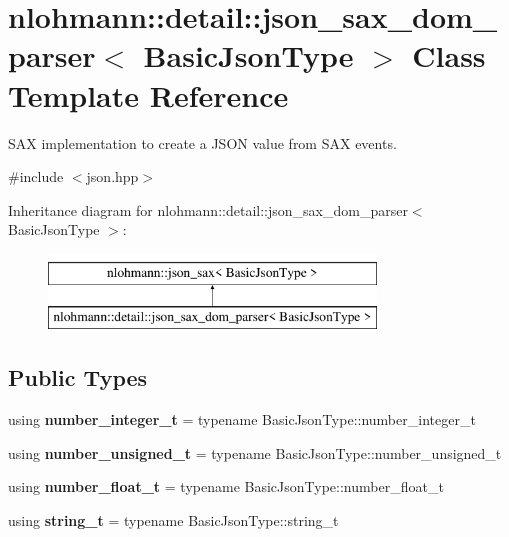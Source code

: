 \hypertarget{classnlohmann_1_1detail_1_1json__sax__dom__parser}{}\section{nlohmann\+:\+:detail\+:\+:json\+\_\+sax\+\_\+dom\+\_\+parser$<$ Basic\+Json\+Type $>$ Class Template Reference}
\label{classnlohmann_1_1detail_1_1json__sax__dom__parser}


S\+AX implementation to create a J\+S\+ON value from S\+AX events.  




{\ttfamily \#include $<$json.\+hpp$>$}

Inheritance diagram for nlohmann\+:\+:detail\+:\+:json\+\_\+sax\+\_\+dom\+\_\+parser$<$ Basic\+Json\+Type $>$\+:\begin{figure}[H]
\begin{center}
\leavevmode
\includegraphics[height=2.000000cm]{classnlohmann_1_1detail_1_1json__sax__dom__parser}
\end{center}
\end{figure}
\subsection*{Public Types}
\begin{DoxyCompactItemize}
\item 
\mbox{\label{classnlohmann_1_1detail_1_1json__sax__dom__parser_a3d5cd67d179aa7422ce90e54984a441e}} 
using {\bfseries number\+\_\+integer\+\_\+t} = typename Basic\+Json\+Type\+::number\+\_\+integer\+\_\+t
\item 
\mbox{\label{classnlohmann_1_1detail_1_1json__sax__dom__parser_a90f19b272530a479db81db11be2ea15c}} 
using {\bfseries number\+\_\+unsigned\+\_\+t} = typename Basic\+Json\+Type\+::number\+\_\+unsigned\+\_\+t
\item 
\mbox{\label{classnlohmann_1_1detail_1_1json__sax__dom__parser_ad8da3aad0147b18b3cb76868480300fe}} 
using {\bfseries number\+\_\+float\+\_\+t} = typename Basic\+Json\+Type\+::number\+\_\+float\+\_\+t
\item 
\mbox{\label{classnlohmann_1_1detail_1_1json__sax__dom__parser_afd4d961ab2a6b01cbe6e840f7fb90cdc}} 
using {\bfseries string\+\_\+t} = typename Basic\+Json\+Type\+::string\+\_\+t
\end{DoxyCompactItemize}
